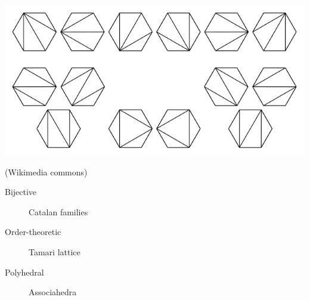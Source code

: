 \documentclass[11pt]{beamer}%
\newcommand{\green}{\color{darkgreen}}
\newcommand{\auth}[1]{{\green\hfill{\footnotesize #1}}}
\begin{document}
\begin{frame}
\begin{center}
      \includegraphics[height=.2\textheight]{catalan2.png}
    \end{center}
\auth{\scriptsize{(Wikimedia commons)}}
  \begin{description}
  \item[Bijective] Catalan families
  \item[Order-theoretic] Tamari lattice
  \item[Polyhedral] Associahedra
  \end{description}
\end{frame}
\end{document}
